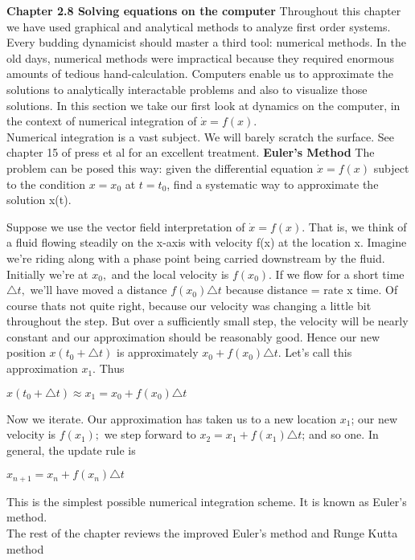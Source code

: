 \documentclass{article}
\begin{document}
\textbf {Chapter 2.8 Solving equations on the computer}
Throughout this chapter we have used graphical and analytical methods to analyze first order systems. Every budding dynamicist should master a third tool: numerical methods. In the old days, numerical methods were impractical because they required enormous amounts of tedious hand-calculation. Computers enable us to approximate the solutions to analytically interactable problems and also to visualize those solutions. In this section we take our first look at dynamics on the computer, in the context of numerical integration of $\dot{x}=f(x)$. \\
Numerical integration is a vast subject. We will barely scratch the surface. See chapter 15 of press et al for an excellent treatment. 
\textbf {Euler's Method}
The problem can be posed this way: given the differential equation $\dot{x}=f(x)$ subject to the condition $x=x_{0}$ at $t=t_{0}$, find a systematic way to approximate the solution x(t).

Suppose we use the vector field interpretation of $\dot{x} = f(x)$. That is, we think of a fluid flowing steadily on the x-axis with velocity f(x) at the location x. Imagine we're riding along with a phase point being carried downstream by the fluid. Initially we're at $x_{0},$ and the local velocity is $f(x_{0})$. If we flow for a short time $\triangle{t},$ we'll have moved a distance $f(x_{0})\triangle{t}$ because distance = rate x time. Of course thats not quite right, because our velocity was changing a little bit throughout the step. But over a sufficiently small step, the velocity will be nearly constant and our approximation should be reasonably good. Hence our new position $x(t_{0}+\triangle{t})$ is approximately $x_{0} + f(x_{0})\triangle{t}$. Let's call this approximation $x_{1}$. Thus 
\begin{center}
$x(t_{0} + \triangle{t}) \approx x_{1} = x_{0} + f(x_{0})\triangle{t}$
\end{center}

Now we iterate. Our approximation has taken us to a new location $x_{1}$; our new velocity is $f(x_{1});$ we step forward to $x_{2} = x_{1} + f(x_{1})\triangle{t}$; and so one. In general, the update rule is 
\begin{center}
$x_{n+1} = x_{n} + f(x_{n})\triangle{t}$
\end{center}

This is the simplest possible numerical integration scheme. It is known as Euler's method.
\\
The rest of the chapter reviews the improved Euler's method and Runge Kutta method
\end{document}
